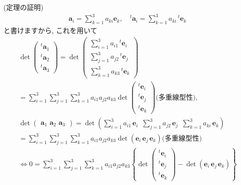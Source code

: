 \documentclass[openany, a4paper, oneside]{book}
\theoremstyle{break}
\theoremstyle{breakdefn}
\begin{document}
(定理の証明)
    \begin{align}
        \bm{a}_{i} = \sum_{k=1}^3 a_{ki} \bm{e}_{k} ,
        \quad
        ^{t}\bm{a}_{i} = \sum_{k=1}^3 a_{ki} \, ^{t}\bm{e}_{k}
    \end{align}
と書けますから, これを用いて
    \begin{gather}
        \det \begin{pmatrix} ^{t}\bm{a}_1 \\ ^{t}\bm{a}_2 \\ ^{t}\bm{a}_3 \end{pmatrix}
        =  \det \begin{pmatrix} \sum_{i=1}^3 a_{i1} \, ^{t}\bm{e}_{i} \\ \sum_{j=1}^3 a_{j2} \, ^{t}\bm{e}_j
        \\ \sum_{k=1}^3 a_{k3} \, ^{t}\bm{e}_{k} \end{pmatrix} \\
        = \sum_{i=1}^3 \sum_{j=1}^3 \sum_{k=1}^3 a_{i1} a_{j2} a_{k3}
            \det \begin{pmatrix} ^{t}\bm{e}_{i} \\ ^{t}\bm{e}_{j} \\ ^{t}\bm{e}_{k} \end{pmatrix}\text{(多重線型性)} ,\\
        \det \begin{pmatrix} \bm{a}_1 \,\, \bm{a}_2 \,\, \bm{a}_3 \end{pmatrix}
        = \det \left (  \sum_{i=1}^3 a_{i1} \, \bm{e}_{i}  \,\,\,  \sum_{j=1}^3 a_{j2} \, \bm{e}_{j}
                \,\,\,  \sum_{k=1}^3 a_{ki} \, \bm{e}_{k}  \right) \\
        = \sum_{i=1}^3 \sum_{j=1}^3 \sum_{k=1}^3 a_{i1} a_{j2} a_{k3}
            \det \left ( \bm{e}_{i} \, \bm{e}_{j} \, \bm{e}_{k} \right) \text{(多重線型性)}  \\
        \Longleftrightarrow
        0 = \sum_{i=1}^3 \sum_{j=1}^3 \sum_{k=1}^3 a_{i1} a_{j2} a_{k3}
                                    \left \{            \det \begin{pmatrix}
                                                        ^{t}\bm{e}_{i} \\ ^{t}\bm{e}_{j} \\ ^{t}\bm{e}_{k}
                                                     \end{pmatrix}
                                                -\det \left ( \bm{e}_{i} \, \bm{e}_{j} \, \bm{e}_{k} \right)
                                    \right \}
    \end{gather}
\end{document}
